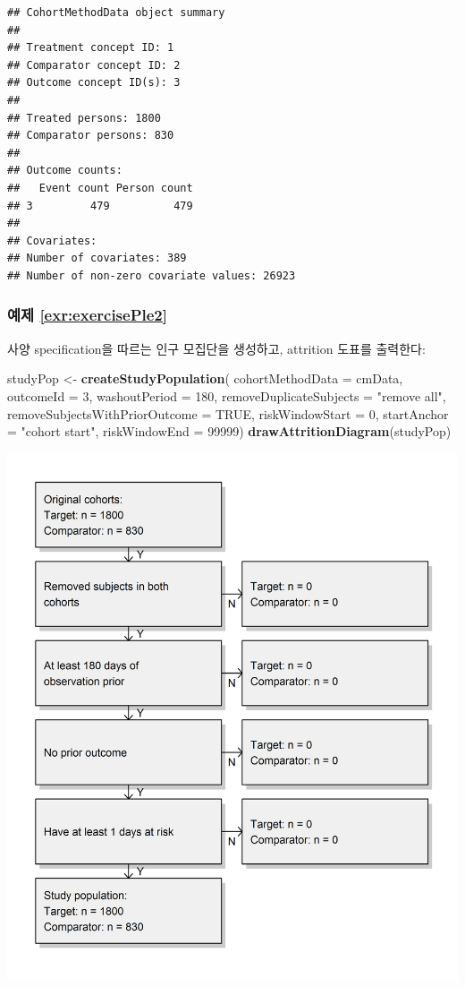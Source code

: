 \documentclass[10.5pt]{book}
\newenvironment{Shaded}{\begin{snugshade}}{\end{snugshade}}
\newcommand{\KeywordTok}[1]{\textcolor[rgb]{0.13,0.29,0.53}{\textbf{#1}}}
\newcommand{\DataTypeTok}[1]{\textcolor[rgb]{0.13,0.29,0.53}{#1}}
\newcommand{\DecValTok}[1]{\textcolor[rgb]{0.00,0.00,0.81}{#1}}
\newcommand{\StringTok}[1]{\textcolor[rgb]{0.31,0.60,0.02}{#1}}
\newcommand{\OtherTok}[1]{\textcolor[rgb]{0.56,0.35,0.01}{#1}}
\newcommand{\NormalTok}[1]{#1}
\theoremstyle{definition}
\theoremstyle{definition}
\theoremstyle{definition}
\theoremstyle{remark}
\begin{document}
\begin{verbatim}
## CohortMethodData object summary
## 
## Treatment concept ID: 1
## Comparator concept ID: 2
## Outcome concept ID(s): 3
## 
## Treated persons: 1800
## Comparator persons: 830
## 
## Outcome counts:
##   Event count Person count
## 3         479          479
## 
## Covariates:
## Number of covariates: 389
## Number of non-zero covariate values: 26923
\end{verbatim}

\subsubsection*{예제 \ref{exr:exercisePle2}}\label{-refexrexerciseple2}

사양 specification을 따르는 인구 모집단을 생성하고, attrition 도표를
출력한다:

\begin{Shaded}
\begin{Highlighting}[]
\NormalTok{studyPop <-}\StringTok{ }\KeywordTok{createStudyPopulation}\NormalTok{(}
  \DataTypeTok{cohortMethodData =}\NormalTok{ cmData,}
  \DataTypeTok{outcomeId =} \DecValTok{3}\NormalTok{,}
  \DataTypeTok{washoutPeriod =} \DecValTok{180}\NormalTok{,}
  \DataTypeTok{removeDuplicateSubjects =} \StringTok{"remove all"}\NormalTok{,}
  \DataTypeTok{removeSubjectsWithPriorOutcome =} \OtherTok{TRUE}\NormalTok{,}
  \DataTypeTok{riskWindowStart =} \DecValTok{0}\NormalTok{,}
  \DataTypeTok{startAnchor =} \StringTok{"cohort start"}\NormalTok{,}
  \DataTypeTok{riskWindowEnd =} \DecValTok{99999}\NormalTok{)}
\KeywordTok{drawAttritionDiagram}\NormalTok{(studyPop)}
\end{Highlighting}
\end{Shaded}

\begin{center}\includegraphics[width=0.8\linewidth]{images/SuggestedAnswers/attrition} \end{center}
\end{document}
